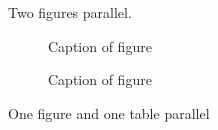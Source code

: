 Two figures parallel.

\begin{figure}[htb]
  \centering
  \begin{minipage}[b]{0.45\textwidth}\center
  \caption{Caption of figure}
  \label{fig:4}
  \end{minipage}\hspace{0.05\textwidth}
  \begin{minipage}[b]{0.45\textwidth}\center
  \caption{Caption of figure}
  \label{fig:5}
  \end{minipage}
\end{figure}

One figure and one table parallel

